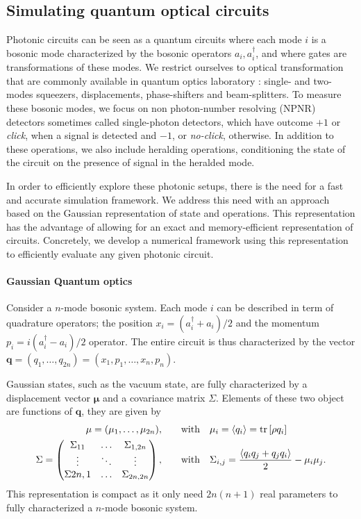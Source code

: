 \subsection{Simulating quantum optical circuits}

Photonic circuits can be seen as a quantum circuits where each mode $i$ is a bosonic mode characterized by the bosonic operators $a_i,a_i^\dagger$, and where gates are transformations of these modes.
We restrict ourselves to optical transformation that are commonly available in quantum optics laboratory : single- and two-modes squeezers, displacements, phase-shifters and beam-splitters.
To measure these bosonic modes, we focus on non photon-number resolving (NPNR) detectors sometimes called single-photon detectors, which have outcome $+1$ or \textit{click}, when a signal is detected and $-1$, or \textit{no-click}, otherwise.
In addition to these operations, we also include heralding operations, conditioning the state of the circuit on the presence of signal in the heralded mode.


In order to efficiently explore these photonic setups, there is the need for a fast and accurate simulation framework.
We address this need with an approach based on the Gaussian representation of state and operations.
This representation has the advantage of allowing for an exact and memory-efficient representation of circuits.
Concretely, we develop a numerical framework using this representation to efficiently evaluate any given photonic circuit.


\paragraph{Gaussian Quantum optics}

Consider a $n$-mode bosonic system. 
Each mode $i$ can be described in term of quadrature operators; the position $x_i=(a_i^\dagger+a_i)/2$ and the momentum $p_i=i(a_i^\dagger-a_i)/2$ operator.
The entire circuit is thus characterized by the vector $\mathbf{q}=(q_1,\dots,q_{2n})=(x_1,p_1,\dots,x_n,p_n)$.

Gaussian states, such as the vacuum state, are fully characterized by a displacement vector $\mathbf{\mu}$ and a covariance matrix $\Sigma$.
Elements of these two object are functions of $\mathbf{q}$, they are given by
\begin{align}
	\mathbf{\mu} = (\mu_1,\dots,\mu_{2n}), \qquad &\text{with}\quad \mu_i = \mean{q_i} = \trr{\rho q_i} \\
	\Sigma = \begin{pmatrix} \Sigma_{11} & \dots & \Sigma_{1,2n} \\
							\vdots & \ddots & \vdots \\
						\Sigma{2n,1} & \dots & \Sigma_{2n,2n}\end{pmatrix} , \qquad &\text{with}\quad \Sigma_{i,j} = \frac{\mean{q_i q_j + q_j q_i}}{2}-\mu_i \mu_j.
\end{align}
This representation is compact as it only need $2n(n+1)$ real parameters to fully characterized a $n$-mode bosonic system.


